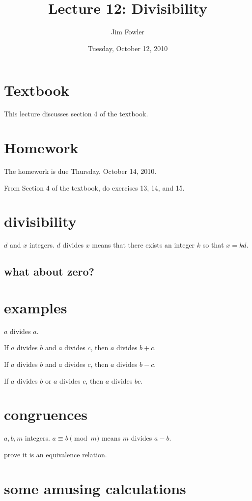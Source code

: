 \documentclass[12pt]{handout}
\title{Lecture 12: Divisibility}
\author{Jim Fowler}
\date{Tuesday, October 12, 2010}
\begin{document}
\maketitle

\section*{Textbook}

This lecture discusses section 4 of the textbook.

\section*{Homework} 

The homework is due Thursday, October 14, 2010.

From Section 4 of the textbook, do exercises 13, 14, and 15.

\section*{divisibility}

$d$ and $x$ integers.  $d$ divides $x$  means that there exists an integer $k$ so that $x = kd$.

\subsection*{what about zero?}

\section*{examples}

$a$ divides $a$.

If $a$ divides $b$ and $a$ divides $c$, then $a$ divides $b + c$.

If $a$ divides $b$ and $a$ divides $c$, then $a$ divides $b - c$.

If $a$ divides $b$ or $a$ divides $c$, then $a$ divides $bc$.

\section*{congruences}

$a, b, m$ integers.  $a \equiv b \pmod m$ means $m$ divides $a - b$.

prove it is an equivalence relation.

\section*{some amusing calculations}
\end{document}
